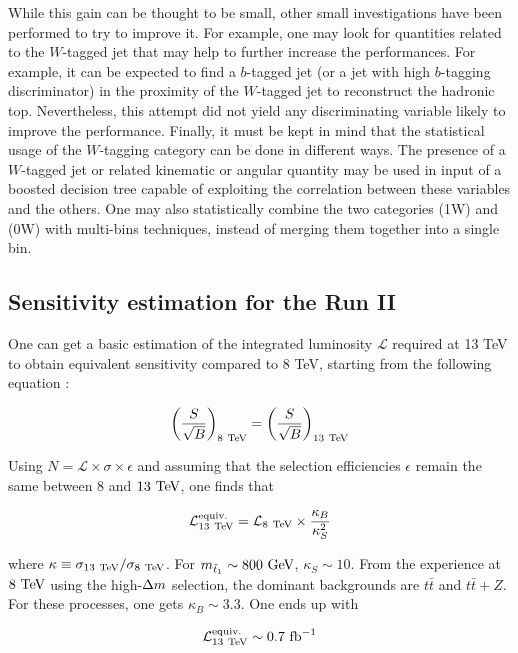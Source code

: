         While this gain can be thought to be small, other small investigations have been
        performed to try to improve it.
        For example, one may look for quantities related to the $W$-tagged jet that may help to further
        increase the performances. For example, it can be expected to find a $b$-tagged
        jet (or a jet with high $b$-tagging discriminator) in the proximity of the $W$-tagged
        jet to reconstruct the hadronic top. Nevertheless, this attempt did not yield
        any discriminating variable likely to improve the performance.
        Finally, it must be kept in mind that the statistical usage of the $W$-tagging
        category can be done in different ways. The presence of a $W$-tagged jet or
        related kinematic or angular quantity may be used in input of a boosted decision
        tree capable of exploiting the correlation between these variables and the others.
        One may also statistically combine the two categories (1W) and (0W) with multi-bins
        techniques, instead of merging them together into a single bin.

        \subsection{Sensitivity estimation for the Run II}

        One can get a basic estimation of the integrated luminosity $\mathcal{L}$ required
        at 13 TeV to obtain equivalent sensitivity compared to 8 TeV, starting from the
        following equation :

        $$ \left( \frac{S}{\sqrt{B}} \right)_{8~\text{TeV}} = \left( \frac{S}{\sqrt{B}} \right)_{13~\text{TeV}}  $$

        Using $N = \mathcal{L} \times \sigma \times \epsilon$ and assuming that the selection
        efficiencies $\epsilon$ remain the same between $8$ and $13~\text{TeV}$, one finds that

        $$ \mathcal{L}^\text{equiv.}_{13~\text{TeV}} = \mathcal{L}_{8~\text{TeV}} \times \frac{\kappa_B}{\kappa^2_S} $$

        where $\kappa \equiv \sigma_{13~\text{TeV}} / \sigma_{8~\text{TeV}}$. For $m_{\tilde{t}_1} \sim 800~\text{GeV}$,
        $\kappa_S \sim 10$. From the experience at $8~\text{TeV}$ using the high-$\Delta m$ selection,
        the dominant backgrounds are $t\bar{t}$ and $t\bar{t}+Z$. For these processes, one
        gets $\kappa_B \sim 3.3$. One ends up with

        $$ \mathcal{L}^\text{equiv.}_{13~\text{TeV}} \sim 0.7~\text{fb}^{-1}$$

